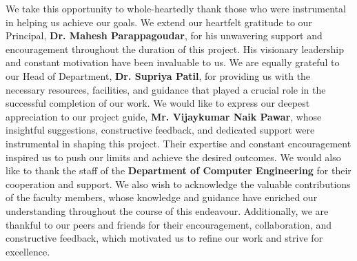 We take this opportunity to whole-heartedly thank those who were instrumental in helping us achieve our goals. We extend our heartfelt gratitude to our Principal, \textbf{Dr. Mahesh Parappagoudar}, for his unwavering support and encouragement throughout the duration of this project. His visionary leadership and constant motivation have been invaluable to us.
\vspace{1em} %
We are equally grateful to our Head of Department, \textbf{Dr. Supriya Patil}, for providing us with the necessary resources, facilities, and guidance that played a crucial role in the successful completion of our work. We would like to express our deepest appreciation to our project guide, \textbf{Mr. Vijaykumar Naik Pawar}, whose insightful suggestions, constructive feedback, and dedicated support were instrumental in shaping this project. Their expertise and constant encouragement inspired us to push our limits and achieve the desired outcomes.
\vspace{1em} %
We would also like to thank the staff of the \textbf{Department of Computer Engineering} for their cooperation and support. We also wish to acknowledge the valuable contributions of the faculty members, whose knowledge and guidance have enriched our understanding throughout the course of this endeavour. Additionally, we are thankful to our peers and friends for their encouragement, collaboration, and constructive feedback, which motivated us to refine our work and strive for excellence.\\
